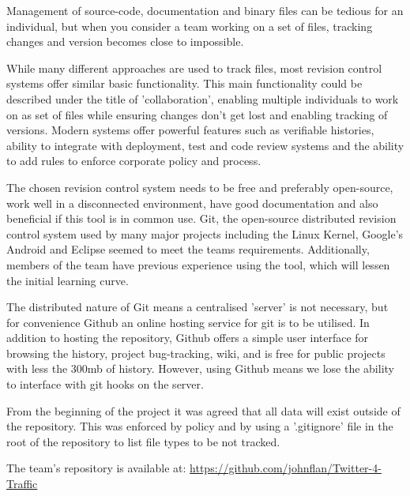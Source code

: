 Management of source-code, documentation and binary files can be tedious for an individual, but when you consider a team working on a set of files, tracking changes and version becomes close to impossible.

While many different approaches are used to track files, most revision control systems offer
similar basic functionality. This main functionality could be described under
the title of 'collaboration', enabling multiple individuals to work on as set of
files while ensuring changes don't get lost and enabling tracking of versions.
Modern systems offer powerful features such as verifiable histories, ability to integrate with deployment, test and code review systems and the ability to add rules to enforce corporate policy and process.

The chosen revision control system needs to be free and preferably open-source,
work well in a disconnected environment, have good documentation and also
beneficial if this tool is in common use. Git\cite{website:git_scm}, the
open-source distributed revision control system used by many major projects
including the Linux Kernel, Google's Android and Eclipse seemed to meet the
teams requirements. Additionally, members of the team have previous experience using the tool, which will lessen the initial learning curve.

The distributed nature of Git means a centralised 'server' is not necessary,
but for convenience Github\cite{website:github} an online hosting service for
git is to be utilised. In addition to hosting the repository, Github offers a
simple user interface for browsing the history, project bug-tracking, wiki, and
is free for public projects with less the 300mb of history. However, using
Github means we lose the ability to interface with git hooks on the server. 

From the beginning of the project it was agreed that all data will exist
outside of the repository. This was enforced by policy and by using a
'.gitignore' file in the root of the repository to list file types to be not tracked.  

The team's repository is available at: \url{https://github.com/johnflan/Twitter-4-Traffic}
\pagebreak 
